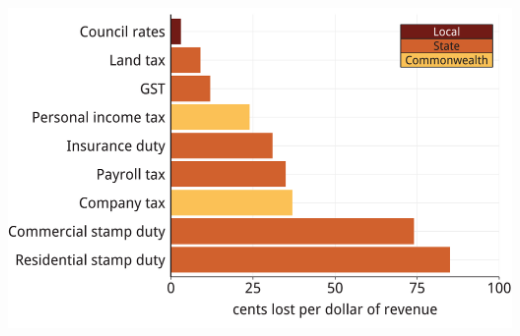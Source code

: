 \documentclass[tikz]{standalone}\usepackage[]{graphicx}\usepackage[]{color}
\newenvironment{knitrout}{}{} %
\begin{document}
\clearpage
\begin{knitrout}
\color{fgcolor}
\includegraphics[width=11.000in,height=7.00in]{./Property-taxes/atlas/figure/PROP-Figure8-1} 

\end{knitrout}
\end{document}
